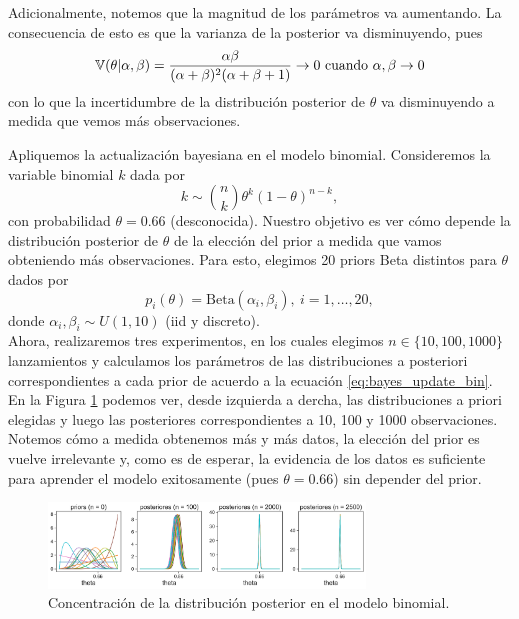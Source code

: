 Adicionalmente, notemos que la magnitud de los parámetros va aumentando. La consecuencia de esto es que la varianza de la posterior va disminuyendo, pues 
\begin{equation}
	\operatorname{\mathbb{V}}(\theta|\alpha,\beta) = \frac{\alpha\beta}{(\alpha+\beta)^2(\alpha+\beta+1)} \to 0 \text{ cuando }\alpha,\beta\to 0
\end{equation}
con lo que la incertidumbre de la distribución posterior de $\theta$ va disminuyendo a medida que vemos más observaciones. 

\begin{mdframed}[style=ejemplo, frametitle={\center Ejemplo: modelo binomial}]

Apliquemos la actualización bayesiana en el modelo binomial. Consideremos la variable binomial $k$ dada por
\begin{equation}
	k \sim \binom{n}{k}\theta^k(1-\theta)^{n-k},
\end{equation}
con probabilidad $\theta=0.66$ (desconocida). Nuestro objetivo es ver cómo depende la distribución posterior de $\theta$ de la elección del prior a medida que vamos obteniendo más observaciones. Para esto, elegimos 20 priors Beta distintos para $\theta$ dados por 
\begin{equation}
	p_i(\theta)  = \text{Beta}(\alpha_i,\beta_i),\  i=1,\ldots,20,
\end{equation}
donde $\alpha_i,\beta_i\sim U(1,10)$ (iid y discreto).\\

Ahora, realizaremos tres experimentos, en los cuales elegimos $n\in\{10,100,1000\}$ lanzamientos y calculamos los parámetros de las distribuciones a posteriori correspondientes a cada prior de acuerdo a la ecuación \eqref{eq:bayes_update_bin}. En la Figura \ref{fig:bayes_binomial} podemos ver, desde izquierda a dercha, las  distribuciones a priori elegidas y luego las posteriores correspondientes a 10, 100 y 1000 observaciones. Notemos cómo a medida obtenemos más y más datos, la elección del prior es vuelve irrelevante y, como es de esperar, la evidencia de los datos es suficiente para aprender el modelo exitosamente (pues $\theta  =  0.66$) sin  depender del prior.

\begin{figure}[H] 
	\centering	
	\includegraphics[width=0.75\textwidth,frame ]{img/cap2_bayesian_binomial.pdf}
	\caption{Concentración de la distribución posterior en el modelo binomial.}
	\label{fig:bayes_binomial}
\end{figure}

\end{mdframed}


